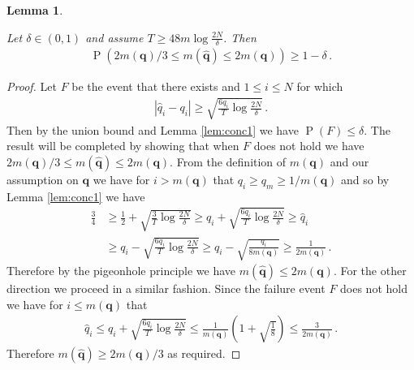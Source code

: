 \documentclass[11pt,a4paper,twoside]{report}
\newcommand{\eq}[1]{\begin{align*}#1\end{align*}}
\renewcommand{\P}[1]{\operatorname{P}\left(#1\right)}
\renewcommand{\vec}[1]{\boldsymbol{#1}}
\theoremstyle{plain}
\newtheorem{lemma}[theorem]{Lemma}
\theoremstyle{definition}
\begin{document}
\begin{lemma}\label{lem:m_est}

Let $\delta \in (0,1)$ and assume $T \geq 48m \log\frac{2N}{\delta}$. Then
\eq{
\P{2m(\vec{q}) / 3 \leq m(\vec{\hat q}) \leq 2m(\vec{q})} \geq 1 - \delta\,.
}
\end{lemma}

\begin{proof}
Let $F$ be the event that there exists and $1 \leq i \leq N$ for which
\eq{
\left|\hat q_i - q_i\right| \geq \sqrt{\frac{6q_i}{T} \log \frac{2N}{\delta}}\,.
}
Then by the union bound and Lemma \ref{lem:conc1} we have $\P{F} \leq \delta$. The result will be completed by showing that
when $F$ does not hold we have $2m(\vec{q})/3 \leq m(\vec{\hat q}) \leq 2m(\vec{q})$.
From the definition of $m(\vec{q})$ and our assumption on $\vec{q}$ we have for $i > m(\vec{q})$ that $q_i \geq q_m \geq 1/m(\vec{q})$ and so by Lemma \ref{lem:conc1} we have
\eq{
\frac{3}{4} 
&\geq \frac{1}{2} + \sqrt{\frac{3}{T} \log \frac{2N}{\delta}} 
\geq q_i + \sqrt{\frac{6q_i}{T} \log \frac{2N}{\delta}} 
\geq \hat q_i \\
&\geq q_i - \sqrt{\frac{6q_i}{T} \log \frac{2N}{\delta}}
\geq q_i - \sqrt{\frac{q_i}{8m(\vec{q})}}
\geq \frac{1}{2m(\vec{q})}\,.
}
Therefore by the pigeonhole principle we have $m(\vec{\hat q}) \leq 2m(\vec{q})$.
For the other direction we proceed in a similar fashion. Since the failure event $F$ does not hold we have for $i \leq m(\vec{q})$ that
\eq{
\hat q_i 
\leq q_i + \sqrt{\frac{6q_i}{T} \log\frac{2N}{\delta}} 
\leq \frac{1}{m(\vec{q})} \left(1 + \sqrt{\frac{1}{8}}\right)
\leq \frac{3}{2m(\vec{q})}\,.
}
Therefore $m(\vec{\hat q}) \geq 2m(\vec{q}) / 3$ as required. 
\end{proof}
\end{document}
